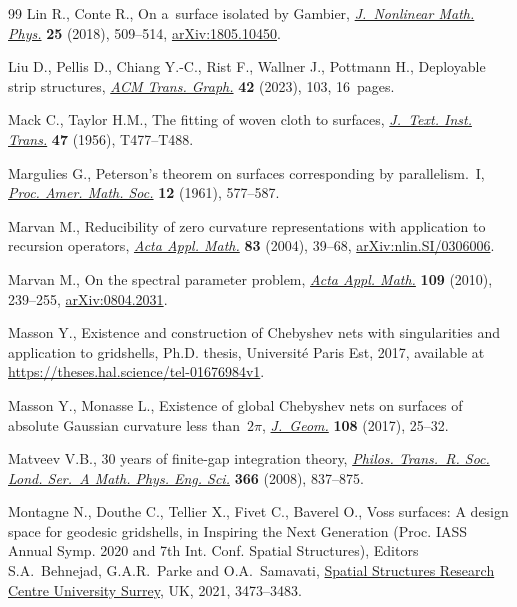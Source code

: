 \documentclass[pdftex]{sigma}
\numberwithin{equation}{section}
\begin{document}
\begin{thebibliography}{99}
Lin R., Conte R., On a~surface isolated by {G}ambier, \href{https://doi.org/10.1080/14029251.2018.1503393}{\textit{J.~Nonlinear
  Math. Phys.}} \textbf{25} (2018), 509--514, \href{https://arxiv.org/abs/1805.10450}{arXiv:1805.10450}.

Liu D., Pellis D., Chiang Y.-C., Rist F., Wallner J., Pottmann H., Deployable
  strip structures, \href{https://doi.org/10.1145/3592393}{\textit{ACM Trans. Graph.}} \textbf{42} (2023), 103,
  16~pages.

Mack C., Taylor H.M., The fitting of woven cloth to surfaces, \href{https://doi.org/10.1080/19447027.1956.10750433}{\textit{J.~Text.
  Inst. Trans.}} \textbf{47} (1956), T477--T488.

Margulies G., Peterson's theorem on surfaces corresponding by parallelism.~{I},
  \href{https://doi.org/10.2307/2034248}{\textit{Proc. Amer. Math. Soc.}} \textbf{12} (1961), 577--587.

Marvan M., Reducibility of zero curvature representations with application to
  recursion operators, \href{https://doi.org/10.1023/B:ACAP.0000035588.67805.0b}{\textit{Acta Appl. Math.}} \textbf{83} (2004), 39--68,
  \href{https://arxiv.org/abs/nlin.SI/0306006}{arXiv:nlin.SI/0306006}.

Marvan M., On the spectral parameter problem, \href{https://doi.org/10.1007/s10440-009-9450-4}{\textit{Acta Appl. Math.}}
  \textbf{109} (2010), 239--255, \href{https://arxiv.org/abs/0804.2031}{arXiv:0804.2031}.

Masson Y., Existence and construction of Chebyshev nets with singularities and
  application to gridshells, Ph.D. thesis, {U}niversit\'e Paris Est, 2017,
  available at \url{https://theses.hal.science/tel-01676984v1}.

Masson Y., Monasse L., Existence of global {C}hebyshev nets on surfaces of
  absolute {G}aussian curvature less than~{$2\pi$}, \href{https://doi.org/10.1007/s00022-016-0319-1}{\textit{J.~Geom.}}
  \textbf{108} (2017), 25--32.

Matveev V.B., 30 years of finite-gap integration theory, \href{https://doi.org/10.1098/rsta.2007.2055}{\textit{Philos.
  Trans.~R. Soc. Lond. Ser.~A Math. Phys. Eng. Sci.}} \textbf{366} (2008),
  837--875.

Montagne N., Douthe C., Tellier X., Fivet C., Baverel O., Voss surfaces: {A}
  design space for geodesic gridshells, in Inspiring the Next Generation (Proc.
  IASS Annual Symp. 2020 and 7th Int. Conf. Spatial Structures), Editors S.A.~Behnejad, G.A.R.~Parke and O.A.~Samavati, \href{https://doi.org/10.15126/900337}{Spatial Structures Research Centre University Surrey}, UK,
  2021, 3473--3483.


\end{thebibliography}
\end{document}
